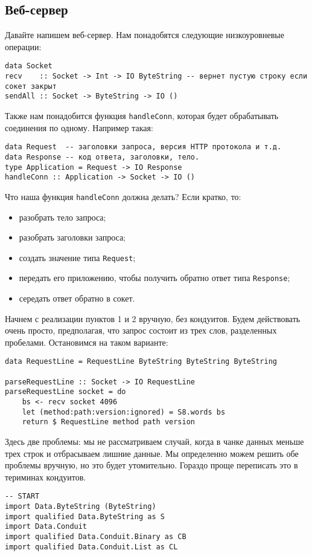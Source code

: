 {\subsection{Веб-сервер}
Давайте напишем веб-сервер. Нам понадобятся следующие низкоуровневые операции:
\begin{lstlisting}
data Socket
recv    :: Socket -> Int -> IO ByteString -- вернет пустую строку если сокет закрыт
sendAll :: Socket -> ByteString -> IO ()
\end{lstlisting}
Также нам понадобится функция \lstinline'handleConn', которая будет обрабатывать 
соединения по одному. Например такая:
\begin{lstlisting}
data Request  -- заголовки запроса, версия HTTP протокола и т.д.
data Response -- код ответа, заголовки, тело.
type Application = Request -> IO Response
handleConn :: Application -> Socket -> IO ()
\end{lstlisting}
Что наша функция \lstinline'handleConn' должна делать? Если кратко, то:
\begin{itemize}  
\item   разобрать тело запроса;
\item   разобрать заголовки запроса;
\item   создать значение типа \lstinline'Request';
\item   передать его приложению, чтобы получить обратно ответ типа \lstinline'Response';
\item   середать ответ обратно в сокет.
\end{itemize}  
Начнем с реализации пунктов 1 и 2 вручную, без кондуитов. Будем действовать очень 
просто, предполагая, что запрос состоит из трех слов, разделенных пробелами. 
Остановимся на таком варианте:
\begin{lstlisting}
data RequestLine = RequestLine ByteString ByteString ByteString

parseRequestLine :: Socket -> IO RequestLine
parseRequestLine socket = do
    bs <- recv socket 4096
    let (method:path:version:ignored) = S8.words bs
    return $ RequestLine method path version
\end{lstlisting}
Здесь две проблемы: мы не рассматриваем случай, когда в чанке данных меньше 
трех строк и отбрасываем лишние данные. Мы определенно можем решить обе 
проблемы вручную, но это будет утомительно. Гораздо проще переписать это 
в териминах кондуитов.
\begin{lstlisting}
-- START
import Data.ByteString (ByteString)
import qualified Data.ByteString as S
import Data.Conduit
import qualified Data.Conduit.Binary as CB
import qualified Data.Conduit.List as CL


\end{lstlisting}}
